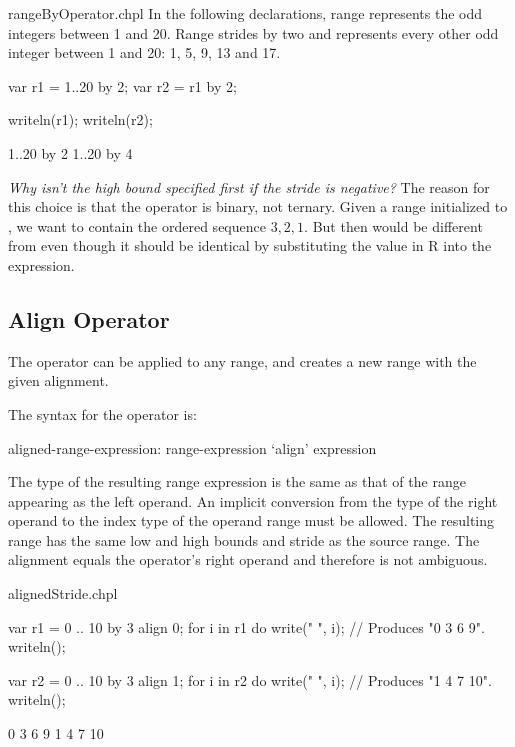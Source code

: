 \begin{chapelexample}{rangeByOperator.chpl}
In the following declarations, range  represents the odd integers
between 1 and 20. Range  strides  by two and represents
every other odd integer between 1 and 20: 1, 5, 9, 13 and 17.
\begin{chapel}
var r1 = 1..20 by 2;
var r2 = r1 by 2;
\end{chapel}
\begin{chapelpost}
writeln(r1);
writeln(r2);
\end{chapelpost}
\begin{chapeloutput}
1..20 by 2
1..20 by 4
\end{chapeloutput}
\end{chapelexample}

\begin{rationale}
{\it Why isn't the high bound specified first if the stride is
negative?}  The reason for this choice is that the  operator
is binary, not ternary.  Given a range  initialized
to , we want  to contain the ordered sequence
$3,2,1$.  But then  would be different from  even though it should be identical by substituting the value in
R into the expression.
\end{rationale}


\subsection{Align Operator}
\label{Align_Operator}

The  operator can be applied to any range, and creates a new range
with the given alignment.  

The syntax for the  operator is:
\begin{syntax}
aligned-range-expression:
  range-expression `align' expression
\end{syntax}
\noindent The type of the resulting range expression is the same as that of the
range appearing as the left operand.  An implicit conversion from
the type of the right operand to the index type of the operand range
must be allowed.
The resulting range has the
same low and high bounds and stride as the source range. The
alignment equals the  operator's right operand
and therefore is not ambiguous. 

\begin{chapelexample}{alignedStride.chpl}
\begin{chapel}
var r1 = 0 .. 10 by 3 align 0;
for i in r1 do
  write(" ", i);			// Produces "0 3 6 9".
writeln();

var r2 = 0 .. 10 by 3 align 1;
for i in r2 do
  write(" ", i);			// Produces "1 4 7 10".
writeln();
\end{chapel}
\begin{chapeloutput}
 0 3 6 9
 1 4 7 10
\end{chapeloutput}
\end{chapelexample}

